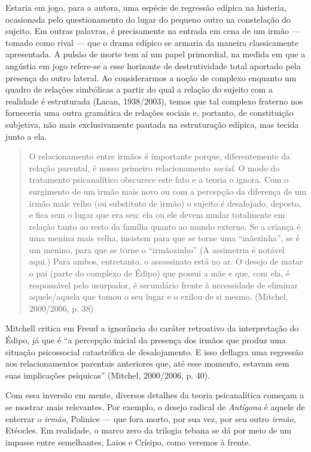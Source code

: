 Estaria em jogo, para a autora, uma espécie de regressão edípica na
histeria, ocasionada pelo questionamento do lugar do pequeno outro na
constelação do sujeito. Em outras palavras, é precisamente na entrada em
cena de um irmão --- tomado como rival --- que o drama edípico se
armaria da maneira classicamente apresentada. A pulsão de morte tem aí
um papel primordial, na medida em que a angústia em jogo refere-se a
esse horizonte de destrutividade total aportado pela presença do outro
lateral. Ao considerarmos a noção de complexo enquanto um quadro de
relações simbólicas a partir do qual a relação do sujeito com a
realidade é estruturada (Lacan, 1938/2003), temos que tal complexo
fraterno nos forneceria uma outra gramática de relações sociais e,
portanto, de constituição subjetiva, não mais exclusivamente pautada na
estruturação edípica, mas tecida junto a ela.

\begin{quote}
O relacionamento entre irmãos é importante porque, diferentemente da
relação parental, é nosso primeiro relacionamento \emph{social}. O modo
do tratamento psicanalítico obscurece este fato e a teoria o ignora. Com
o surgimento de um irmão mais novo ou com a percepção da diferença de um
irmão mais velho (ou substituto de irmão) o sujeito é desalojado,
deposto, e fica sem o lugar que era seu: ela ou ele devem mudar
totalmente em relação tanto ao resto da família quanto ao mundo externo.
Se a criança é uma menina mais velha, insistem para que se torne uma
``mãezinha'', se é um menino, para que se torne o ``irmãozinho'' (A
assimetria é notável aqui.) Para ambos, entretanto, o assassinato está
no ar. O desejo de matar o pai (parte do complexo de Édipo) que possui a
mãe e que, com ela, é responsável pelo usurpador, é secundário frente à
necessidade de eliminar aquele/aquela que tomou o seu lugar e o exilou
de si mesmo. (Mitchel, 2000/2006, p. 38)
\end{quote}

Mitchell critica em Freud a ignorância do caráter retroativo da
interpretação do Édipo, já que é ``a percepção inicial da presença dos
irmãos que produz uma situação psicossocial catastrófica de
desalojamento. E isso deflagra uma regressão aos relacionamentos
parentais anteriores que, até esse momento, estavam sem suas implicações
psíquicas'' (Mitchel, 2000/2006, p. 40).

Com essa inversão em mente, diversos detalhes da teoria psicanalítica
começam a se mostrar mais relevantes. Por exemplo, o desejo radical de
\emph{Antígona} é aquele de enterrar o \emph{irmão}, Polinice --- que
fora morto, por sua vez, por seu outro \emph{irmão}, Etéocles. Em
realidade, o marco zero da trilogia tebana se dá por meio de um impasse
entre semelhantes, Laios e Crísipo, como veremos à frente.

